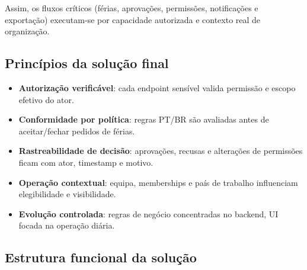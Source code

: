 \documentclass[11pt,a4paper]{article}
\begin{document}
Assim, os fluxos críticos (férias, aprovações, permissões, notificações e exportação) executam-se por capacidade autorizada e contexto real de organização.

\subsection{Princípios da solução final}
\begin{itemize}
  \item \textbf{Autorização verificável}: cada endpoint sensível valida permissão e escopo efetivo do ator.
  \item \textbf{Conformidade por política}: regras PT/BR são avaliadas antes de aceitar/fechar pedidos de férias.
  \item \textbf{Rastreabilidade de decisão}: aprovações, recusas e alterações de permissões ficam com ator, timestamp e motivo.
  \item \textbf{Operação contextual}: equipa, memberships e país de trabalho influenciam elegibilidade e visibilidade.
  \item \textbf{Evolução controlada}: regras de negócio concentradas no backend, UI focada na operação diária.
\end{itemize}

\subsection{Estrutura funcional da solução}
\end{document}
